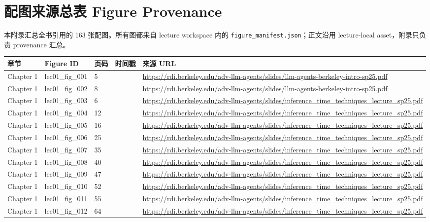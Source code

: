\chapter{配图来源总表 Figure Provenance}
本附录汇总全书引用的 163 张配图。所有图都来自 lecture workspace 内的 \texttt{figure\_manifest.json}；正文沿用 lecture-local asset，附录只负责 provenance 汇总。
\scriptsize
\begin{longtable}{p{}p{}p{}p{}p{}}
\toprule
章节 & Figure ID & 页码 & 时间戳 & 来源 URL \\
\midrule
\endhead
Chapter 1 & lec01\_fig\_001 & 5 &  & \url{https://rdi.berkeley.edu/adv-llm-agents/slides/llm-agents-berkeley-intro-sp25.pdf} \\
Chapter 1 & lec01\_fig\_002 & 8 &  & \url{https://rdi.berkeley.edu/adv-llm-agents/slides/llm-agents-berkeley-intro-sp25.pdf} \\
Chapter 1 & lec01\_fig\_003 & 6 &  & \url{https://rdi.berkeley.edu/adv-llm-agents/slides/inference_time_techniques_lecture_sp25.pdf} \\
Chapter 1 & lec01\_fig\_004 & 12 &  & \url{https://rdi.berkeley.edu/adv-llm-agents/slides/inference_time_techniques_lecture_sp25.pdf} \\
Chapter 1 & lec01\_fig\_005 & 16 &  & \url{https://rdi.berkeley.edu/adv-llm-agents/slides/inference_time_techniques_lecture_sp25.pdf} \\
Chapter 1 & lec01\_fig\_006 & 25 &  & \url{https://rdi.berkeley.edu/adv-llm-agents/slides/inference_time_techniques_lecture_sp25.pdf} \\
Chapter 1 & lec01\_fig\_007 & 35 &  & \url{https://rdi.berkeley.edu/adv-llm-agents/slides/inference_time_techniques_lecture_sp25.pdf} \\
Chapter 1 & lec01\_fig\_008 & 40 &  & \url{https://rdi.berkeley.edu/adv-llm-agents/slides/inference_time_techniques_lecture_sp25.pdf} \\
Chapter 1 & lec01\_fig\_009 & 47 &  & \url{https://rdi.berkeley.edu/adv-llm-agents/slides/inference_time_techniques_lecture_sp25.pdf} \\
Chapter 1 & lec01\_fig\_010 & 52 &  & \url{https://rdi.berkeley.edu/adv-llm-agents/slides/inference_time_techniques_lecture_sp25.pdf} \\
Chapter 1 & lec01\_fig\_011 & 55 &  & \url{https://rdi.berkeley.edu/adv-llm-agents/slides/inference_time_techniques_lecture_sp25.pdf} \\
Chapter 1 & lec01\_fig\_012 & 64 &  & \url{https://rdi.berkeley.edu/adv-llm-agents/slides/inference_time_techniques_lecture_sp25.pdf} \\

\end{longtable}
